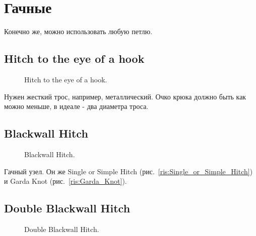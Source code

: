 \section{Гачные}

Конечно же, можно использовать любую петлю.

\subsection{Hitch to the eye of a hook}

\begin{figure}[H]\centering
	\begin{minipage}{1\linewidth}
		\begin{center}
			\tcbox[enhanced jigsaw,colframe=black,opacityframe=0.5,opacityback=0.5]
			{\centering{}}
		\end{center}
	\end{minipage}
\caption{Hitch to the eye of a hook.}
\label{ris:Hitch_to_the_eye_of_a_hook}
\end{figure}

Нужен жесткий трос, например, металлический. Очко крюка должно быть как можно меньше, в идеале - два диаметра троса.

\subsection{Blackwall Hitch}

\begin{figure}[H]\centering
	\begin{minipage}{1\linewidth}
		\begin{center}
			\tcbox[enhanced jigsaw,colframe=black,opacityframe=0.5,opacityback=0.5]
			{\centering{}}
		\end{center}
	\end{minipage}
\caption{Blackwall Hitch.}
\label{ris:Blackwall_Hitch}
\end{figure}

Гачный узел. Он же Single or Simple Hitch (рис.~\ref{ris:Single_or_Simple_Hitch}) и Garda Knot (рис.~\ref{ris:Garda_Knot}).

\subsection{Double Blackwall Hitch}

\begin{figure}[H]\centering
	\begin{minipage}{1\linewidth}
		\begin{center}
			\tcbox[enhanced jigsaw,colframe=black,opacityframe=0.5,opacityback=0.5]
			{\centering{}}
		\end{center}
	\end{minipage}
\caption{Double Blackwall Hitch.}
\label{ris:Double_Blackwall}
\end{figure}

